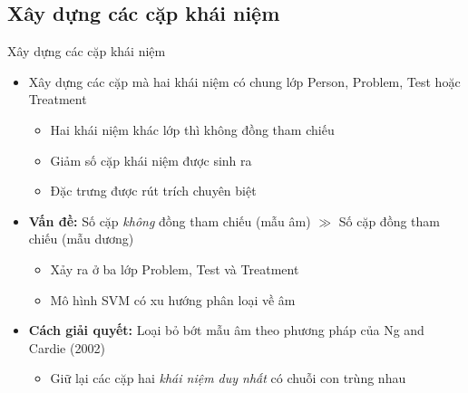 \subsection*{Xây dựng các cặp khái niệm}
\begin{frame}{Xây dựng các cặp khái niệm}
\putlogo
\begin{itemize}
	\item Xây dựng các cặp mà hai khái niệm có chung lớp Person, Problem, Test hoặc Treatment
	\begin{itemize}
		\item Hai khái niệm khác lớp thì không đồng tham chiếu
		\item Giảm số cặp khái niệm được sinh ra
		\item Đặc trưng được rút trích chuyên biệt
	\end{itemize}
	\item \textbf{Vấn đề:} Số cặp \emph{không} đồng tham chiếu (mẫu âm) $\gg$ Số cặp đồng tham chiếu (mẫu dương)
	\begin{itemize}
		\item Xảy ra ở ba lớp Problem, Test và Treatment
		\item Mô hình SVM có xu hướng phân loại về âm
	\end{itemize}
	\item \textbf{Cách giải quyết:} Loại bỏ bớt mẫu âm theo phương pháp của Ng and Cardie (2002)
	\begin{itemize}
		\item Giữ lại các cặp hai \textit{khái niệm duy nhất} có chuỗi con trùng nhau
	\end{itemize}
\end{itemize}
\end{frame}


